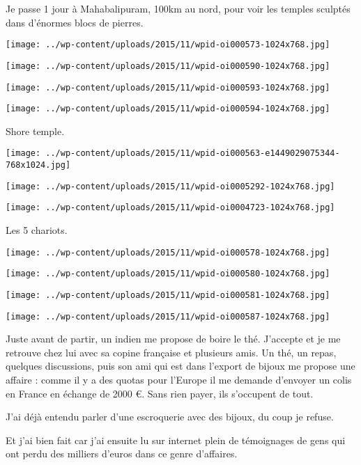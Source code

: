 \pagebreak
 Je passe 1 jour à Mahabalipuram, 100km au nord, pour voir les temples sculptés dans d'énormes blocs de pierres. 
\begin{center} \texttt{[image: ../wp-content/uploads/2015/11/wpid-oi000573-1024x768.jpg]} \end{center}
\begin{center} \texttt{[image: ../wp-content/uploads/2015/11/wpid-oi000590-1024x768.jpg]} \end{center}
\begin{center} \texttt{[image: ../wp-content/uploads/2015/11/wpid-oi000593-1024x768.jpg]} \end{center}
\begin{center} \texttt{[image: ../wp-content/uploads/2015/11/wpid-oi000594-1024x768.jpg]} \end{center}

\pagebreak
 Shore temple. 
\begin{center} \texttt{[image: ../wp-content/uploads/2015/11/wpid-oi000563-e1449029075344-768x1024.jpg]} \end{center} 
\begin{center} \texttt{[image: ../wp-content/uploads/2015/11/wpid-oi0005292-1024x768.jpg]} \end{center}
\begin{center} \texttt{[image: ../wp-content/uploads/2015/11/wpid-oi0004723-1024x768.jpg]} \end{center}

 Les 5 chariots. 
\begin{center} \texttt{[image: ../wp-content/uploads/2015/11/wpid-oi000578-1024x768.jpg]} \end{center}
\begin{center} \texttt{[image: ../wp-content/uploads/2015/11/wpid-oi000580-1024x768.jpg]} \end{center}
\begin{center} \texttt{[image: ../wp-content/uploads/2015/11/wpid-oi000581-1024x768.jpg]} \end{center}
\begin{center} \texttt{[image: ../wp-content/uploads/2015/11/wpid-oi000587-1024x768.jpg]} \end{center}

 Juste avant de partir, un indien me propose de boire le thé. J'accepte et je me retrouve chez lui avec sa copine française et plusieurs amis. Un thé, un repas, quelques discussions, puis son ami qui est dans l'export de bijoux me propose une affaire : comme il y a des quotas pour l'Europe il me demande d'envoyer un colis en France en échange de 2000 €. Sans rien payer, ils s'occupent de tout. 

 J'ai déjà entendu parler d'une escroquerie avec des bijoux, du coup je refuse. 

 Et j'ai bien fait car j'ai ensuite lu sur internet plein de témoignages de gens qui ont perdu des milliers d'euros dans ce genre d'affaires.
